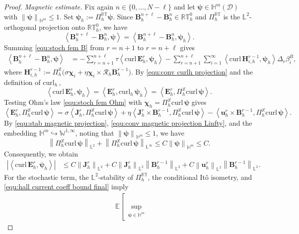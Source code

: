 \documentclass[11pt, reqno]{amsart}
\theoremstyle{definition}
\numberwithin{equation}{section}
\newcommand{\curl}{\mathrm{curl}\,}
\newcommand{\bff}{\boldsymbol}
\newcommand{\bb}{\mathbb}
\newcommand{\norm}[2]{\left\|{#1}\right\|_{#2}}
\newcommand{\inpro}[2]{\left\langle#1,#2\right\rangle}
\newcommand{\abs}[1]{\left|{#1}\right|}
\newcommand{\curlh}{\mathrm{curl}_h\,}
\begin{document}
\begin{proof}
	\emph{Magnetic estimate.}
	Fix again $n\in\{0,\ldots,N-\ell\}$ and let
	$\bff\psi\in\bb H^m(\mathscr D)$ with
	$\norm{\bff\psi}{\bb H^m}\le1$. Set $\bff\psi_h:=\Pi_h^{\bb{RT}}\bff\psi$.
	Since
	$\bff B_h^{n+\ell}-\bff B_h^n\in\bb{RT}_h^0$ and
	$\Pi_h^{\bb{RT}}$ is the $\bb L^2$-orthogonal projection onto
	$\bb{RT}_h^0$, we have
	\[
	\inpro{\bff B_h^{n+\ell}-\bff B_h^n}{\bff\psi}
	=
	\inpro{\bff B_h^{n+\ell}-\bff B_h^n}{\bff\psi_h}.
	\]
	Summing \eqref{equ:stoch fem B} from $r=n+1$ to $r=n+\ell$ gives
	\begin{align}
		\label{equ:conv magnetic increment testing}
		\inpro{\bff B_h^{n+\ell}-\bff B_h^n}{\bff\psi}
		&=
		-\sum_{r=n+1}^{n+\ell}\tau
		\inpro{\curl\bff E_h^r}{\bff\psi_h}
		-\sum_{r=n+1}^{n+\ell}\sum_{i=1}^{\infty}
		\inpro{\curl\bff H_{i,h}^{r-1}}{\bff\psi_h}
		\Delta_r\beta_i^B,
	\end{align}
	where
	$\bff H_{i,h}^{r-1}
	:=
	\Pi_h^{\bb X}
	\bigl(
	\sigma\bff\chi_i
	+
	\eta\bff\chi_i\times\mathcal R_h\bff B_h^{r-1}
	\bigr)$.
	By \eqref{equ:conv curlh projection} and the definition of $\curlh$,
	\[
	\inpro{\curl\bff E_h^r}{\bff\psi_h}
	=
	\inpro{\bff E_h^r}{\curlh\bff\psi_h}
	=
	\inpro{\bff E_h^r}{\Pi_h^{\bb X}\curl\bff\psi}.
	\]
	Testing Ohm's law \eqref{equ:stoch fem Ohm} with
	$\bff\chi_h=\Pi_h^{\bb X}\curl\bff\psi$ gives
	\[
	\inpro{\bff E_h^r}{\Pi_h^{\bb X}\curl\bff\psi}
	=
	\sigma\inpro{\bff J_h^r}{\Pi_h^{\bb X}\curl\bff\psi}
	+
	\eta\inpro{\bff J_h^r\times\bff B_h^{r-1}}
	{\Pi_h^{\bb X}\curl\bff\psi}
	-
	\inpro{\bff u_h^r\times\bff B_h^{r-1}}
	{\Pi_h^{\bb X}\curl\bff\psi}.
	\]
	By \eqref{equ:stab magnetic projection}, \eqref{equ:conv magnetic projection Linfty},
	and the embedding
	$\bb H^m\hookrightarrow \bb W^{1,\infty}$, noting that $\norm{\bff\psi}{\bb H^m}\leq 1$, we have
	\[
	\norm{\Pi_h^{\bb X}\curl\bff\psi}{\bb L^2}
	+
	\norm{\Pi_h^{\bb X}\curl\bff\psi}{\bb L^\infty}
	\le
	C\norm{\bff\psi}{\bb H^m}
	\le
	C.
	\]
	Consequently, we obtain
	\begin{align}
		\label{equ:conv curlE bound}
		\abs{\inpro{\curl\bff E_h^r}{\bff\psi_h}}
		&\le
		C\norm{\bff J_h^r}{\bb L^2}
		+
		C\norm{\bff J_h^r}{\bb L^2}
		\norm{\bff B_h^{r-1}}{\bb L^2}
		+
		C\norm{\bff u_h^r}{\bb L^2}
		\norm{\bff B_h^{r-1}}{\bb L^2}.
	\end{align}
	For the stochastic term, the $\bb L^2$-stability of
	$\Pi_h^{\bb{RT}}$, the conditional It\^o isometry, and
	\eqref{equ:hall current coeff bound final} imply
	\begin{align*}
		&\bb E
		\left[
		\sup_{\substack{\bff\psi\in\bb H^m\\
}}
\end{align*}
\end{proof}
\end{document}
